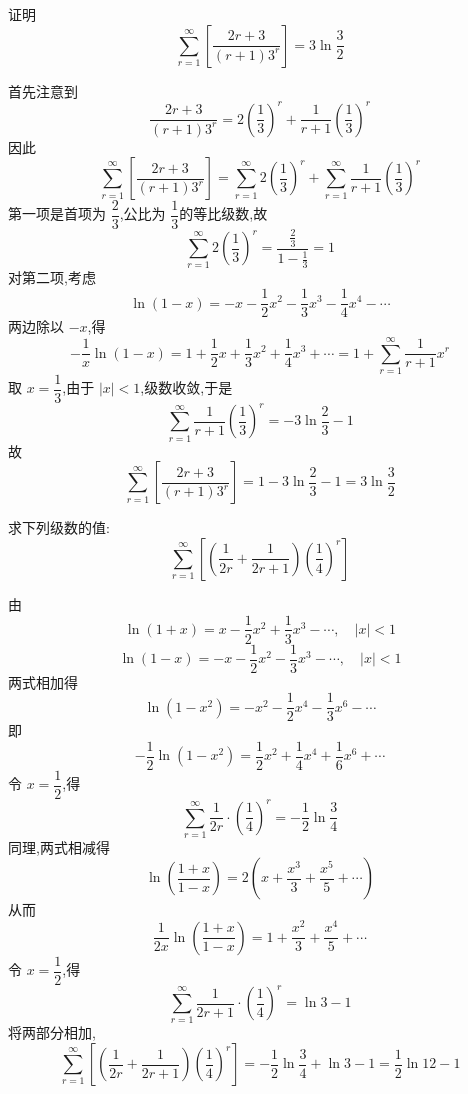 \begin{questions}
    \question 证明
    \[
    \sum_{r=1}^{\infty}\left[\frac{2r+3}{(r+1)3^r}\right]=3\ln\frac{3}{2}
    \]
    \begin{solution}
        首先注意到
        \[
        \frac{2r+3}{(r+1)3^r}
        =2\left(\frac{1}{3}\right)^r+\frac{1}{r+1}\left(\frac{1}{3}\right)^r
        \]
        因此
        \[
        \sum_{r=1}^{\infty}\left[\frac{2r+3}{(r+1)3^r}\right]
        =\sum_{r=1}^{\infty}2\left(\frac{1}{3}\right)^r
        +\sum_{r=1}^{\infty}\frac{1}{r+1}\left(\frac{1}{3}\right)^r
        \]
        第一项是首项为 $\dfrac{2}{3}$,公比为 $\dfrac{1}{3}$的等比级数,故
        \[
        \sum_{r=1}^{\infty}2\left(\frac{1}{3}\right)^r
        =\frac{\frac{2}{3}}{1-\frac{1}{3}}=1
        \]
        对第二项,考虑
        \[
        \ln(1-x)=-x-\frac{1}{2}x^2-\frac{1}{3}x^3-\frac{1}{4}x^4-\cdots
        \]
        两边除以 $-x$,得
        \[
        -\frac{1}{x}\ln(1-x)
        =1+\frac{1}{2}x+\frac{1}{3}x^2+\frac{1}{4}x^3+\cdots
        =1+\sum_{r=1}^{\infty}\frac{1}{r+1}x^r
        \]
        取 $x=\dfrac{1}{3}$,由于 $|x|<1$,级数收敛,于是
        \[
        \sum_{r=1}^{\infty}\frac{1}{r+1}\left(\frac{1}{3}\right)^r
        =-3\ln\frac{2}{3}-1
        \]
        故
        \[
        \sum_{r=1}^{\infty}\left[\frac{2r+3}{(r+1)3^r}\right]
        =1-3\ln\frac{2}{3}-1
        =3\ln\frac{3}{2}
        \]
    \end{solution}

    \question 求下列级数的值:
    \[
    \sum_{r=1}^{\infty} \left[\left(\frac{1}{2r}+\frac{1}{2r+1}\right)\left(\frac{1}{4}\right)^r\right]
    \]
    \begin{solution}
        由
        \[
        \ln(1+x)=x-\frac{1}{2}x^2+\frac{1}{3}x^3-\cdots,\quad |x|<1
        \]
        \[
        \ln(1-x)=-x-\frac{1}{2}x^2-\frac{1}{3}x^3-\cdots,\quad |x|<1
        \]
        两式相加得
        \[
        \ln(1-x^2)= -x^2-\frac{1}{2}x^4-\frac{1}{3}x^6-\cdots
        \]
        即
        \[
        -\frac{1}{2}\ln(1-x^2)=\frac{1}{2}x^2+\frac{1}{4}x^4+\frac{1}{6}x^6+\cdots
        \]
        令 $x=\dfrac{1}{2}$,得
        \[
        \sum_{r=1}^{\infty} \frac{1}{2r} \cdot \left(\frac{1}{4}\right)^r
        =-\frac{1}{2}\ln\frac{3}{4}
        \]
        同理,两式相减得
        \[
        \ln\left(\frac{1+x}{1-x}\right)
        =2\left(x+\frac{x^3}{3}+\frac{x^5}{5}+\cdots\right)
        \]
        从而
        \[
        \frac{1}{2x}\ln\left(\frac{1+x}{1-x}\right)
        =1+\frac{x^2}{3}+\frac{x^4}{5}+\cdots
        \]
        令 $x=\dfrac{1}{2}$,得
        \[
        \sum_{r=1}^{\infty} \frac{1}{2r+1} \cdot \left(\frac{1}{4}\right)^r
        =\ln 3-1
        \]
        将两部分相加,
        \[
        \sum_{r=1}^{\infty} \left[\left(\frac{1}{2r}+\frac{1}{2r+1}\right)\left(\frac{1}{4}\right)^r\right]
        =-\frac{1}{2}\ln\frac{3}{4}+\ln 3-1=\frac{1}{2}\ln 12-1
        \]
    \end{solution}


\end{questions}

